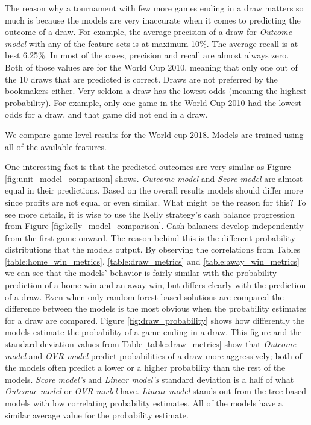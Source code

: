 The reason why a tournament with few more games ending in a draw matters so much is because the models are very inaccurate when it comes to predicting the outcome of a draw. For example, the average precision of a draw for \textit{Outcome model} with any of the feature sets is at maximum 10\%. The average recall is at best 6.25\%. In most of the cases, precision and recall are almost always zero. Both of those values are for the World Cup 2010, meaning that only one out of the 10 draws that are predicted is correct. Draws are not preferred by the bookmakers either. Very seldom a draw has the lowest odds (meaning the highest probability). For example, only one game in the World Cup 2010 had the lowest odds for a draw, and that game did not end in a draw.

We compare game-level results for the World cup 2018. Models are trained using all of the available features.

One interesting fact is that the predicted outcomes are very similar as Figure \ref{fig:unit_model_comparison} shows. \textit{Outcome model} and \textit{Score model} are almost equal in their predictions. Based on the overall results models should differ more since profits are not equal or even similar. What might be the reason for this? To see more details, it is wise to use the Kelly strategy's cash balance progression from Figure \ref{fig:kelly_model_comparison}. Cash balances develop independently from the first game onward. The reason behind this is the different probability distributions that the models output. By observing the correlations from Tables \ref{table:home_win_metrics}, \ref{table:draw_metrics} and \ref{table:away_win_metrics} we can see that the models' behavior is fairly similar with the probability prediction of a home win and an away win, but differs clearly with the prediction of a draw. Even when only random forest-based solutions are compared the difference between the models is the most obvious when the probability estimates for a draw are compared. Figure \ref{fig:draw_probability} shows how differently the models estimate the probability of a game ending in a draw. This figure and the standard deviation values from Table \ref{table:draw_metrics} show that \textit{Outcome model} and \textit{OVR model} predict probabilities of a draw more aggressively; both of the models often predict a lower or a higher probability than the rest of the models. \textit{Score model's} and \textit{Linear model's} standard deviation is a half of what \textit{Outcome model} or \textit{OVR model} have. \textit{Linear model} stands out from the tree-based models with low correlating probability estimates. All of the models have a similar average value for the probability estimate.

